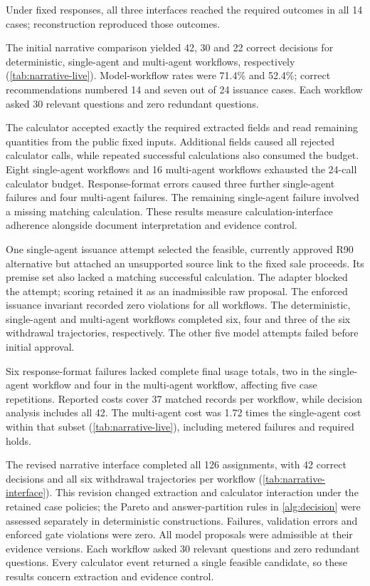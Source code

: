 \documentclass[oneside,10pt,english]{swissi}
\begin{document}
Under fixed responses, all three interfaces reached the required outcomes in all 14 cases; reconstruction reproduced those outcomes.

The initial narrative comparison yielded 42, 30 and 22 correct decisions for deterministic, single-agent and multi-agent workflows, respectively (\cref{tab:narrative-live}). Model-workflow rates were 71.4\% and 52.4\%; correct recommendations numbered 14 and seven out of 24 issuance cases. Each workflow asked 30 relevant questions and zero redundant questions.



The calculator accepted exactly the required extracted fields and read remaining quantities from the public fixed inputs. Additional fields caused all rejected calculator calls, while repeated successful calculations also consumed the budget. Eight single-agent workflows and 16 multi-agent workflows exhausted the 24-call calculator budget. Response-format errors caused three further single-agent failures and four multi-agent failures. The remaining single-agent failure involved a missing matching calculation. These results measure calculation-interface adherence alongside document interpretation and evidence control.

One single-agent issuance attempt selected the feasible, currently approved R90 alternative but attached an unsupported source link to the fixed sale proceeds. Its premise set also lacked a matching successful calculation. The adapter blocked the attempt; scoring retained it as an inadmissible raw proposal. The enforced issuance invariant recorded zero violations for all workflows. The deterministic, single-agent and multi-agent workflows completed six, four and three of the six withdrawal trajectories, respectively. The other five model attempts failed before initial approval.

Six response-format failures lacked complete final usage totals, two in the single-agent workflow and four in the multi-agent workflow, affecting five case repetitions. Reported costs cover 37 matched records per workflow, while decision analysis includes all 42. The multi-agent cost was 1.72 times the single-agent cost within that subset (\cref{tab:narrative-live}), including metered failures and required holds.

The revised narrative interface completed all 126 assignments, with 42 correct decisions and all six withdrawal trajectories per workflow (\cref{tab:narrative-interface}). This revision changed extraction and calculator interaction under the retained case policies; the Pareto and answer-partition rules in \cref{alg:decision} were assessed separately in deterministic constructions. Failures, validation errors and enforced gate violations were zero. All model proposals were admissible at their evidence versions. Each workflow asked 30 relevant questions and zero redundant questions. Every calculator event returned a single feasible candidate, so these results concern extraction and evidence control.
\end{document}
